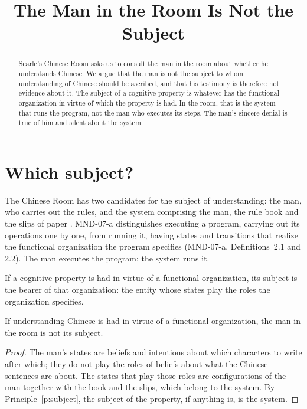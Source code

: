 \documentclass{situationist-preprint}
\title{The Man in the Room Is Not the Subject}
\begin{document}
\maketitle

\begin{abstract}
Searle's Chinese Room asks us to consult the man in the room about whether he understands Chinese. We argue that the man is not the subject to whom understanding of Chinese should be ascribed, and that his testimony is therefore not evidence about it. The subject of a cognitive property is whatever has the functional organization in virtue of which the property is had. In the room, that is the system that runs the program, not the man who executes its steps. The man's sincere denial is true of him and silent about the system.
\end{abstract}

\section{Which subject?}

The Chinese Room has two candidates for the subject of understanding: the man, who carries out the rules, and the system comprising the man, the rule book and the slips of paper \citep{Searle1980}. MND-07-a distinguishes executing a program, carrying out its operations one by one, from running it, having states and transitions that realize the functional organization the program specifies (MND-07-a, Definitions~2.1 and 2.2). The man executes the program; the system runs it.

\begin{principle}\label{p:subject}
If a cognitive property is had in virtue of a functional organization, its subject is the bearer of that organization: the entity whose states play the roles the organization specifies.
\end{principle}

\begin{proposition}\label{p:notman}
If understanding Chinese is had in virtue of a functional organization, the man in the room is not its subject.
\end{proposition}

\begin{proof}
The man's states are beliefs and intentions about which characters to write after which; they do not play the roles of beliefs about what the Chinese sentences are about. The states that play those roles are configurations of the man together with the book and the slips, which belong to the system. By Principle~\ref{p:subject}, the subject of the property, if anything is, is the system.
\end{proof}
\end{document}
